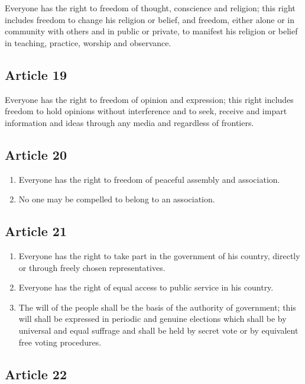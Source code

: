 \documentclass[
  ngerman,
  american,
  titlepage,
  openright,
  DIV=calc,
  toc=listof,
  listof=nochaptergap]{scrbook}
\begin{document}
Everyone has the right to freedom of thought, conscience and religion;
this right includes freedom to change his religion or belief, and
freedom, either alone or in community with others and in public or
private, to manifest his religion or belief in teaching, practice,
worship and observance.

\subsection{Article 19}\label{article-19}

Everyone has the right to freedom of opinion and expression; this right
includes freedom to hold opinions without interference and to seek,
receive and impart information and ideas through any media and
regardless of frontiers.

\subsection{Article 20}\label{article-20}

\begin{enumerate}
\def\labelenumi{\arabic{enumi}.}
\item
  Everyone has the right to freedom of peaceful assembly and
  association.
\item
  No one may be compelled to belong to an association.
\end{enumerate}

\subsection{Article 21}\label{article-21}

\begin{enumerate}
\def\labelenumi{\arabic{enumi}.}
\item
  Everyone has the right to take part in the government of his country,
  directly or through freely chosen representatives.
\item
  Everyone has the right of equal access to public service in his
  country.
\item
  The will of the people shall be the basis of the authority of
  government; this will shall be expressed in periodic and genuine
  elections which shall be by universal and equal suffrage and shall be
  held by secret vote or by equivalent free voting procedures.
\end{enumerate}

\subsection{Article 22}\label{article-22}
\end{document}
